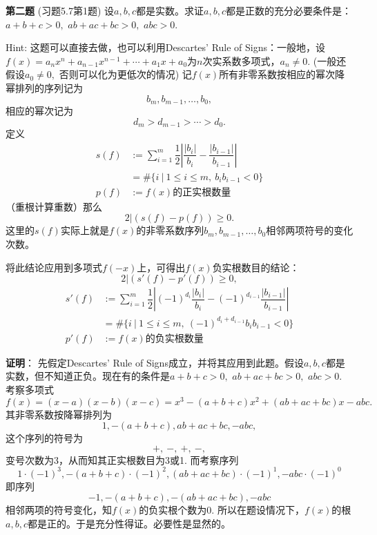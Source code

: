 \fi  %

\newpageorvspace

{\bf 第二题} (习题5.7第1题) 设$a, b, c$都是实数。求证$a, b, c$都是正数的充分必要条件是：$a + b + c > 0,$ $ab + ac + bc > 0,$ $abc > 0.$

\vspace{0.5em}

Hint: 这题可以直接去做，也可以利用Descartes' Rule of Signs：一般地，设$f(x) = a_n x^n + a_{n-1} x^{n-1} + \cdots + a_1 x + a_0$为$n$次实系数多项式，$a_n \neq 0.$ (一般还假设$a_0 \neq 0,$ 否则可以化为更低次的情况) 记$f(x)$所有非零系数按相应的幂次降幂排列的序列记为
$$b_m, b_{m-1}, \ldots, b_0,$$
相应的幂次记为
$$d_m > d_{m-1} > \cdots > d_0.$$
定义
\begin{align*}
s(f) & := \sum\limits_{i=1}^{m} \dfrac{1}{2} \left\lvert \dfrac{|b_{i}|}{b_{i}} - \dfrac{|b_{i-1}|}{b_{i-1}} \right\rvert \\
& = \# \{ i ~|~ 1 \leqslant i \leqslant m, ~ b_{i}b_{i-1} < 0 \} \\
p(f) & := \text{$f(x)$的正实根数量}
\end{align*}
（重根计算重数）那么
$$2 | (s(f) - p(f)) \geqslant 0.$$
这里的$s(f)$实际上就是$f(x)$的非零系数序列$b_m, b_{m-1}, \ldots, b_0$相邻两项符号的变化次数。

将此结论应用到多项式$f(-x)$上，可得出$f(x)$负实根数目的结论：
$$2 | (s'(f) - p'(f)) \geqslant 0,$$
\begin{align*}
s'(f) & := \sum\limits_{i=1}^{m} \dfrac{1}{2} \left\lvert (-1)^{d_{i}}\dfrac{|b_{i}|}{b_{i}} - (-1)^{d_{i-1}}\dfrac{|b_{i-1}|}{b_{i-1}} \right\rvert \\
& = \# \{ i ~|~ 1 \leqslant i \leqslant m, ~ (-1)^{d_i+d_{i-1}}b_{i}b_{i-1} < 0 \} \\
p'(f) & := \text{$f(x)$的负实根数量}
\end{align*}

\ifIncludeAnswer

\newpageorvspace

{\bf 证明}： 先假定Descartes' Rule of Signs成立，并将其应用到此题。假设$a, b, c$都是实数，但不知道正负。现在有的条件是$a + b + c > 0,$ $ab + ac + bc > 0,$ $abc > 0.$ 考察多项式
$$f(x) = (x-a)(x-b)(x-c) = x^3 - (a+b+c)x^2 + (ab+ac+bc)x -abc.$$
其非零系数按降幂排列为
$$1, - (a+b+c), ab+ac+bc, -abc,$$
这个序列的符号为
$$+, ~ -, ~ +, ~-,$$
变号次数为3，从而知其正实根数目为3或1. 而考察序列
$$1\cdot(-1)^3, - (a+b+c)\cdot(-1)^2, (ab+ac+bc)\cdot(-1)^1, -abc\cdot(-1)^0$$
即序列
$$-1, - (a+b+c), -(ab+ac+bc), -abc$$
相邻两项的符号变化，知$f(x)$的负实根个数为0. 所以在题设情况下，$f(x)$的根$a, b, c$都是正的。于是充分性得证。必要性是显然的。

